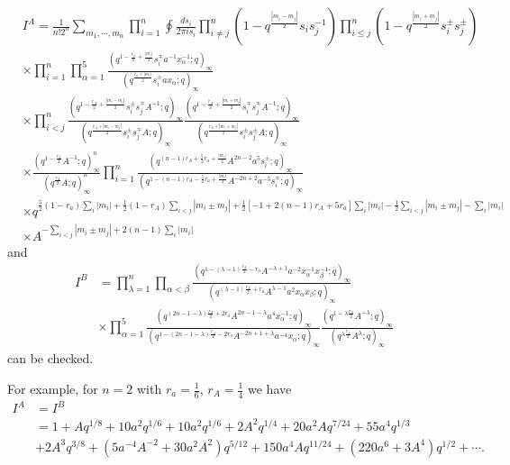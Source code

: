 \documentclass[12pt]{article}
\numberwithin{equation}{section}
\begin{document}
\begin{align}
&
I^A=
\frac{1}{n! 2^n}\sum_{m_1,\cdots, m_n}
\prod_{i=1}^n 
\oint \frac{ds_i}{2\pi is_i}
\prod_{i\neq j}^{n}
(1-q^{\frac{|m_i-m_j|}{2}}s_i s_j^{-1})
\prod_{i\le j}^n
(1-q^{\frac{|m_i+m_j|}{2}}s_i^{\pm} s_j^{\pm})
\nonumber\\
&\times 
\prod_{i=1}^{n}
\prod_{\alpha=1}^5
\frac{
(q^{1-\frac{r_a}{2}+\frac{|m_i|}{2}} s_i^{\mp}a^{-1}x_{\alpha}^{-1};q)_{\infty}
}
{
(q^{\frac{r_a+|m_i|}{2}} s_i^{\pm}ax_{\alpha};q)_{\infty}
}
\nonumber\\
&\times 
\prod_{i<j}^n 
\frac{
(q^{1-\frac{r_A}{2}+\frac{|m_i-m_j|}{2}} s_i^{\pm}s_j^{\mp}A^{-1};q)_{\infty}
}
{
(q^{\frac{r_A+|m_i-m_j|}{2}} s_i^{\pm}s_j^{\mp}A;q)_{\infty}
}
\frac{
(q^{1-\frac{r_A}{2}+\frac{|m_i+m_j|}{2}} s_i^{\mp}s_j^{\mp}A^{-1};q)_{\infty}
}
{
(q^{\frac{r_A+|m_i+m_j|}{2}} s_i^{\pm}s_j^{\pm}A;q)_{\infty}
}
\nonumber\\
&\times 
\frac{
(q^{1-\frac{r_A}{2}}A^{-1};q)_{\infty}^n
}
{
(q^{\frac{r_A}{2}}A;q)_{\infty}^n
}
\prod_{i=1}^n
\frac{
(q^{(n-1)r_A+\frac52 r_a+\frac{|m_i|}{2}}A^{2n-2}a^5s_i^{\pm};q)_{\infty}
}
{
(q^{1-(n-1)r_A-\frac52 r_a+\frac{|m_i|}{2}}A^{-2n+2}a^{-5}s_i^{\mp};q)_{\infty}
}
\nonumber\\
&\times 
q^{\frac{5}{2}(1-r_a)\sum_i|m_i|+\frac{1}{2}(1-r_A)\sum_{i<j}|m_i\pm m_j|+\frac{1}{2}[-1+2(n-1)r_A+5r_a]\sum_{i}|m_i|
-\frac12 \sum_{i<j}|m_i\pm m_j|
-\sum_i|m_i|}
\nonumber\\
&\times 
A^{-\sum_{i<j}|m_i\pm m_j|+2(n-1)\sum_{i}|m_i|}
\end{align}
and 
\begin{align}
I^B&=
\prod_{\lambda=1}^n 
\prod_{\alpha<\beta}
\frac{
(q^{1-(\lambda-1)\frac{r_A}{2}-r_a}A^{-\lambda+1}a^{-2}x_{\alpha}^{-1}x_{\beta}^{-1};q)_{\infty}
}
{
(q^{(\lambda-1)\frac{r_A}{2}+r_a}A^{\lambda-1}a^{2}x_{\alpha}x_{\beta};q)_{\infty}
}
\nonumber\\
&\times 
\prod_{\alpha=1}^5 
\frac{
(q^{(2n-1-\lambda)\frac{r_A}{2}+2r_a}A^{2n-1-\lambda}a^4 x_{\alpha}^{-1};q)_{\infty}
}
{
(q^{1-(2n-1-\lambda)\frac{r_A}{2}-2r_a}A^{-2n+1+\lambda}a^{-4} x_{\alpha};q)_{\infty}
}
\frac{
(q^{1-\lambda\frac{r_A}{2}}A^{-\lambda};q)_{\infty}
}
{
(q^{\lambda\frac{r_A}{2}}A^{\lambda};q)_{\infty}
}
\end{align}
can be checked. 

For example, 
for $n=2$ with $r_a=\frac16$, $r_A=\frac14$ we have 
\begin{align}
I^A&=I^B
\nonumber\\&=1+Aq^{1/8}+10a^2 q^{1/6}+10a^2q^{1/6}
+2A^2q^{1/4}+20a^2Aq^{7/24}+55a^4q^{1/3}
\nonumber\\
&+2A^3q^{3/8}+(5a^{-4}A^{-2}+30a^2A^2)q^{5/12}
+150a^4Aq^{11/24}+(220a^6+3A^4)q^{1/2}+\cdots.
\end{align}
\end{document}
